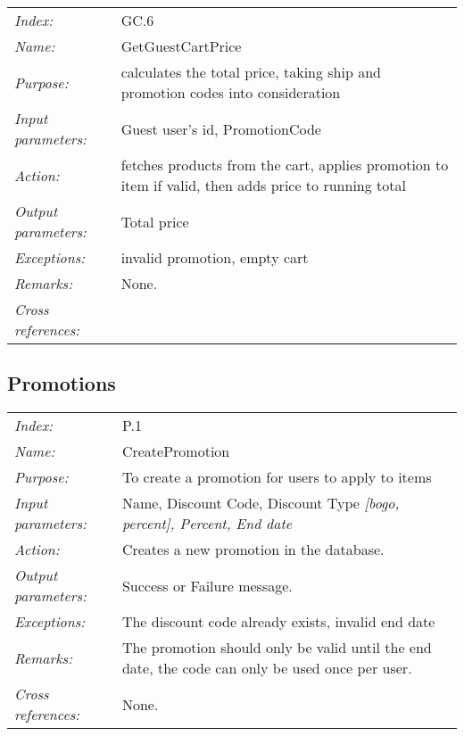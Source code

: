 \documentclass[10pt,letter]{article}
\begin{document}
\begin{tabularx}{\textwidth}{l X}
    \it{Index:} & GC.6 \\
    \it{Name:} & GetGuestCartPrice \\
    \it{Purpose:} & calculates the total price, taking ship and promotion codes into consideration \\
    \it{Input parameters:} & Guest user's id, PromotionCode \\
    \it{Action:} &  fetches products from the cart, applies promotion to item if valid, then adds price to running total\\
    \it{Output parameters:} & Total price  \\
    \it{Exceptions:} &  invalid promotion, empty cart\\
    \it{Remarks:} & None. \\
    \it{Cross references:} & \\
    \hline
\end{tabularx}

\subsection{Promotions}

\begin{tabularx}{\textwidth}{l X}
    \it{Index:} & P.1 \\
    \it{Name:} & CreatePromotion \\
    \it{Purpose:} & To create a promotion for users to apply to items \\
    \it{Input parameters:} & Name, Discount Code, Discount Type \it{[bogo, percent]}, Percent, End date\\
    \it{Action:} & Creates a new promotion in the database.\\
    \it{Output parameters:} & Success or Failure message. \\
    \it{Exceptions:} & The discount code already exists, invalid end date \\
    \it{Remarks:} & The promotion should only be valid until the end date, the code can only be used once per user. \\
    \it{Cross references:} & None. \\
    \hline
\end{tabularx}
\end{document}
